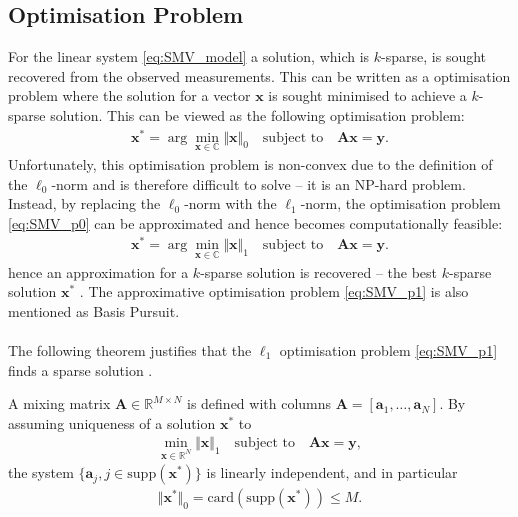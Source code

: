 \subsection{Optimisation Problem}\label{sec:opti}
For the linear system \eqref{eq:SMV_model} a solution, which is $k$-sparse, is sought recovered from the observed measurements. This can be written as a optimisation problem where the solution for a vector $\mathbf{x}$ is sought minimised to achieve a $k$-sparse solution.
This can be viewed as the following optimisation problem:
\begin{align}\label{eq:SMV_p0}
\mathbf{x}^\ast = \arg \min_{\mathbf{x} \in \mathbb{C}} \Vert \mathbf{x} \Vert_0 \quad \text{subject to} \quad \mathbf{Ax} = \mathbf{y}.
\end{align}
Unfortunately, this optimisation problem is non-convex due to the definition of the $\ell_0$-norm and is therefore difficult to solve -- it is an NP-hard problem. 
Instead, by replacing the $\ell_0$-norm with the $\ell_1$-norm, the optimisation problem \eqref{eq:SMV_p0} can be approximated and hence becomes computationally feasible: 
\begin{align}\label{eq:SMV_p1}
\mathbf{x}^\ast = \arg \min_{\mathbf{x} \in \mathbb{C}} \Vert \mathbf{x} \Vert_1 \quad \text{subject to} \quad \mathbf{Ax} = \mathbf{y}.
\end{align} 
hence an approximation for a $k$-sparse solution is recovered -- the best $k$-sparse solution $\mathbf{x}^\ast$ \cite[p. 27]{CS}. The approximative optimisation problem \eqref{eq:SMV_p1} is also mentioned as Basis Pursuit. 
\\ \\
The following theorem justifies that the $\ell_1$ optimisation problem \eqref{eq:SMV_p1} finds a sparse solution \cite[p. 62-63]{FR}.
\begin{theorem}
A mixing matrix $\mathbf{A} \in \mathbb{R}^{M \times N}$ is defined with columns $\mathbf{A} = [\mathbf{a}_1, \dots, \mathbf{a}_N]$. 
By assuming uniqueness of a solution $\mathbf{x}^{\ast}$ to
\begin{align*}
\min_{\mathbf{x} \in \mathbb{R}^N} \Vert \mathbf{x} \Vert_1 \quad \text{subject to} \quad \mathbf{Ax} = \mathbf{y},
\end{align*}
the system $\lbrace \mathbf{a}_j, j \in \text{supp}( \mathbf{x}^\ast) \rbrace$ is linearly independent, and in particular
\begin{align*}
\Vert \mathbf{x}^\ast \Vert_0 = \text{card}(\text{supp} (\mathbf{x}^\ast)) \leq M.
\end{align*}
\end{theorem}
